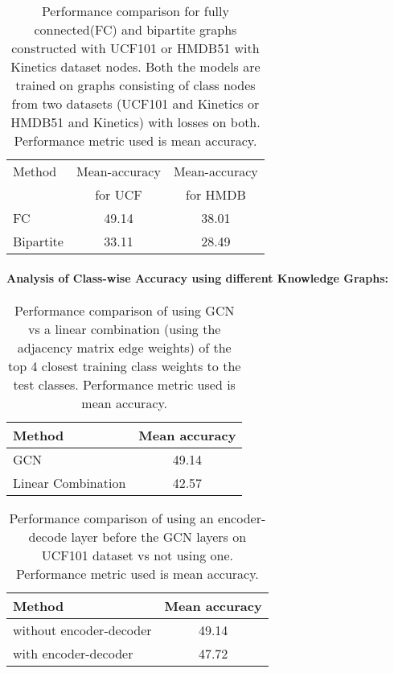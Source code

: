\begin{table}
\centering
\caption{Performance comparison for fully connected(FC) and bipartite graphs constructed with UCF101 or HMDB51 with Kinetics dataset nodes. Both the models are trained on graphs consisting of class nodes from two datasets (UCF101 and Kinetics or HMDB51 and Kinetics) with losses on both. Performance metric used is mean accuracy.}
\begin{tabular}{@{}lcc@{}}
\toprule
Method & Mean-accuracy & Mean-accuracy\\
& for UCF & for HMDB \\ 
\midrule
FC & 49.14 & 38.01\\
Bipartite & 33.11 & 28.49\\
\bottomrule
\end{tabular}
\label{table:fully_vs_bipartite}
\end{table}



\paragraph{\bf Analysis of Class-wise Accuracy using different Knowledge Graphs:}

\begin{table}
  \centering
  \caption{Performance comparison of using GCN vs a linear combination (using the adjacency matrix edge weights) of the top 4 closest training class weights to the test classes. Performance metric used is mean accuracy.}
\begin{tabular}{@{}lc@{}}
    \toprule
    Method & Mean accuracy\\
    \midrule
    GCN & 49.14  \\
    Linear Combination & 42.57 \\
    \bottomrule
    \end{tabular}
\label{table:linear_combo}
\end{table}

\begin{table}
  \centering
  \caption{Performance comparison of using an encoder-decode layer before the GCN layers on UCF101 dataset vs not using one. Performance metric used is mean accuracy.}
\begin{tabular}{@{}lc@{}}
    \toprule
    Method & Mean accuracy\\
    \midrule
    without encoder-decoder & 49.14  \\
    with encoder-decoder & 47.72 \\
    \bottomrule
    \end{tabular}
\label{table:enco_deco}
\end{table}

